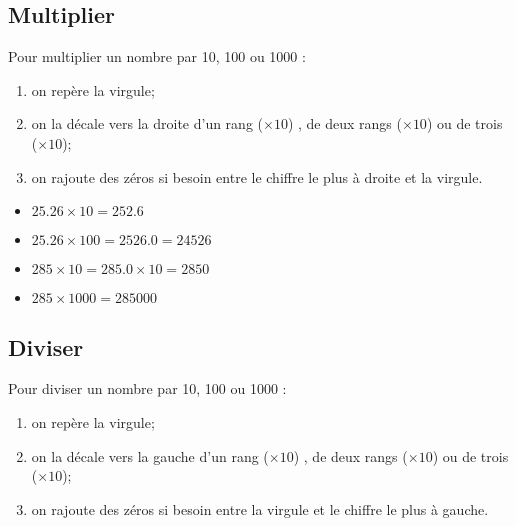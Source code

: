 
\subsection{Multiplier}

\begin{mymeth}
	Pour multiplier un nombre par 10, 100 ou 1000 :
	\begin{enumerate}
		\item on repère la virgule;
		\item on la décale vers la droite d'un rang ($\times 10$) , de deux rangs ($\times 10$) ou de trois ($\times 10$);
		\item on rajoute des zéros si besoin entre le chiffre le plus à droite et la virgule.
	\end{enumerate}
\end{mymeth}

	\begin{myexs}
		\begin{multicols}{2}
			\begin{itemize}
				\item $\num{25.26} \times 10 = \num{252.6}$ 
				\item $\num{25.26} \times 100 = \num{2526.0} = \num{24526}$
				\item $\num{285} \times 10 = \num{285.0} \times \num{10}= \num{2850}$ 
				\item $\num{285} \times 1000 = \num{285000}$ 
			\end{itemize}	
		\end{multicols}
		
	\end{myexs}


\subsection{Diviser}

	\begin{mymeth}
		Pour diviser un nombre par 10, 100 ou 1000 :
		\begin{enumerate}
			\item on repère la virgule;
			\item on la décale vers la gauche d'un rang ($\times 10$) , de deux rangs ($\times 10$) ou de trois ($\times 10$);
			\item on rajoute des zéros si besoin entre la virgule et le chiffre le plus à gauche.
		\end{enumerate}
	\end{mymeth}


